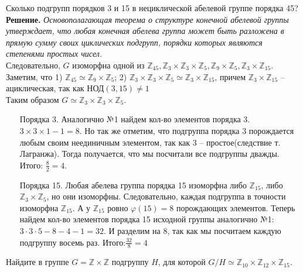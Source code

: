 \documentclass[a4paper, 12pt]{article}
\begin{document}
\begin{spacing}{1}
\begin{center}
\end{center}

\noindent Сколько подгрупп порядков 3 и 15 в нециклической абелевой группе порядка 45?\\

\noindent \textbf{Решение.} \textit{Основополагающая теорема о структуре конечной абелевой группы утверждает, что любая конечная абелева группа может быть разложена в прямую сумму своих циклических подгрупп, порядки которых являются степенями простых чисел.}\\
\noindent Следовательно, $G$ изоморфна одной из $\mathbb{Z}_{45},\mathbb{Z}_3 \times \mathbb{Z}_3 \times \mathbb{Z}_5, \mathbb{Z}_9 \times \mathbb{Z}_5, \mathbb{Z}_3 \times \mathbb{Z}_{15}$.\\
Заметим, что 1) $\mathbb{Z}_{45}\simeq\mathbb{Z}_9 \times\mathbb{Z}_5$;
2) $\mathbb{Z}_3 \times \mathbb{Z}_3 \times \mathbb{Z}_5 \simeq \mathbb{Z}_3 \times \mathbb{Z}_{15}$, причем $\mathbb{Z}_3 \times \mathbb{Z}_{15}$ -- ациклическая, так как $\text{НОД}(3, 15) \neq 1$\\
Таким образом $G \simeq \mathbb{Z}_3 \times \mathbb{Z}_3 \times \mathbb{Z}_5$.
\begin{enumerate}
	\item[Порядка 3.] Аналогично №1 найдем кол-во элементов порядка 3. $3\times3\times1 - 1 = 8$. Но так же отметим, что подгруппа порядка 3 порождается любым своим неединичным элементом, так как 3 -- простое(следствие т. Лагранжа). Тогда получается, что мы посчитали все подгруппы дважды. Итого: $\frac{8}{2} = 4$.
	
	\item[Порядка 15.] Любая абелева группа порядка 15 изоморфна либо $\mathbb{Z}_{15}$, либо $\mathbb{Z}_3 \times \mathbb{Z}_5$, но они изоморфны. Следовательно, каждая подгруппа в точности изоморфна $\mathbb{Z}_{15}$. А у $\mathbb{Z}_{15}$ ровно $\varphi(15) = 8$ порождающих элементов. Теперь найдем кол-во элементов порядка 15 исходной группы аналогично №1: $3\cdot3\cdot5 - 8 - 4 - 1 = 32$. И разделим на 8, так как мы посчитаем каждую подгруппу восемь раз. Итого:$\frac{32}{8} = 4$
\end{enumerate}


\begin{center}
\end{center}

\noindent Найдите в группе $G = \mathbb{Z}\times \mathbb{Z}$ подгруппу $H$, для которой $G/H\simeq\mathbb{Z}_{10}\times\mathbb{Z}_{12}\times\mathbb{Z}_{15}$.\\


\end{spacing}
\end{document}
